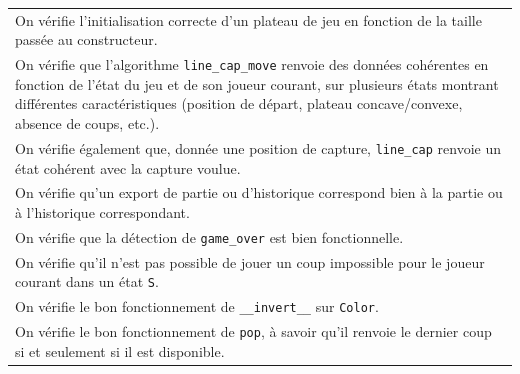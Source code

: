 \documentclass[a4paper,12pt]{article}
\begin{document}
\noindent
\setlength{\arrayrulewidth}{1.5pt}
\renewcommand{\arraystretch}{1.5}
\begin{tabularx}{\textwidth}{|X|}
    \arrayrulecolor{MediumAquamarine}\hline
    \arrayrulecolor{CornflowerBlue}
    On vérifie l’initialisation correcte d’un plateau de jeu en fonction de la taille passée au constructeur.                                                                                                                                                                   \\
    On vérifie que l’algorithme \texttt{line\_cap\_move} renvoie des données cohérentes en fonction de l’état du jeu et de son joueur courant, sur plusieurs états montrant différentes caractéristiques (position de départ, plateau concave/convexe, absence de coups, etc.). \\
    On vérifie également que, donnée une position de capture, \texttt{line\_cap} renvoie un état cohérent avec la capture voulue.                                                                                                                                               \\
    On vérifie qu’un export de partie ou d’historique correspond bien à la partie ou à l’historique correspondant.                                                                                                                                                              \\
    On vérifie que la détection de \texttt{game\_over} est bien fonctionnelle.                                                                                                                                                                                                  \\
    On vérifie qu’il n’est pas possible de jouer un coup impossible pour le joueur courant dans un état \texttt{S}.                                                                                                                                                             \\
    On vérifie le bon fonctionnement de \texttt{\_\_invert\_\_} sur \texttt{Color}.                                                                                                                                                                                             \\
    On vérifie le bon fonctionnement de \texttt{pop}, à savoir qu’il renvoie le dernier coup si et seulement si il est disponible.                                                                                                                                              \\

\end{tabularx}
\end{document}
